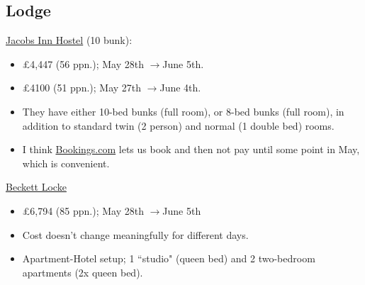 \documentclass[12pt]{article}
\renewcommand{\to}{$\rightarrow$}
\newcommand{\cost}[2]{\pounds#1 (#2 ppn.)}
\begin{document}
	\subsection{Lodge}
	\href{https://www.booking.com/hotel/ie/jacobs-inn.html?aid=355028;sid=3f62ec944d118827daff72c411262409;all_sr_blocks=4030233_332718678_0_2_0;checkin=2022-05-28;checkout=2022-06-05;dest_id=-1502554;dest_type=city;dist=0;group_adults=10;group_children=0;hapos=1;highlighted_blocks=4030233_332718678_0_2_0;hpos=1;matching_block_id=4030233_332718678_0_2_0;no_rooms=1;req_adults=10;req_children=0;room1=A%2CA%2CA%2CA%2CA%2CA%2CA%2CA%2CA%2CA;sb_price_type=total;sr_order=popularity;sr_pri_blocks=4030233_332718678_0_2_0__534084;srepoch=1648311350;srpvid=d240725a64b00365;type=total;ucfs=1&#room_4030233}{Jacobs Inn Hostel} (10 bunk): 
	\begin{itemize}
		\item \cost{4,447}{56}; May 28th \to June 5th.
		\item \cost{4100}{51}; May 27th \to June 4th.
		\item They have either 10-bed bunks (full room), or 8-bed bunks (full room), in addition to standard twin (2 person) and normal (1 double bed) rooms. 
		\item I think \href{https://www.booking.com/}{Bookings.com} lets us book and then not pay until some point in May, which is convenient.
	\end{itemize}
	\href{https://www.booking.com/hotel/ie/beckett-locke.html?sid=3f62ec944d118827daff72c411262409&aid=355028&ucfs=1&arphpl=1&checkin=2022-05-28&checkout=2022-06-05&dest_id=-1502554&dest_type=city&group_adults=10&req_adults=10&no_rooms=1&group_children=0&req_children=0&hpos=2&hapos=2&sr_order=popularity&srpvid=4f9e74ca2749018e&srepoch=1648312598&all_sr_blocks=736390305_335892465_0_0_0%2C736390305_335892465_0_0_0%2C736390302_335892465_0_0_0&highlighted_blocks=736390305_335892465_0_0_0%2C736390305_335892465_0_0_0%2C736390302_335892465_0_0_0&matching_block_id=736390305_335892465_0_0_0&sr_pri_blocks=736390305_335892465_0_0_0__306000%2C736390305_335892465_0_0_0__306000%2C736390302_335892465_0_0_0__204000&from=searchresults#hotelTmpl}{Beckett Locke}
	\begin{itemize}
		\item \cost{6,794}{85}; May 28th \to June 5th 
		\item Cost doesn't change meaningfully for different days.
		\item Apartment-Hotel setup; 1 ``studio" (queen bed) and 2 two-bedroom apartments (2x queen bed).
	\end{itemize}
\end{document}
